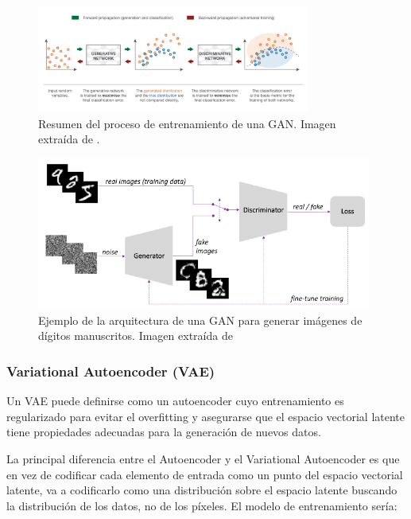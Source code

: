             \begin{figure}[!h]
                \centering
                \includegraphics[width=0.8\textwidth]{img/proceso_entrenamiento_GAN.png}
                \caption{Resumen del proceso de entrenamiento de una GAN. Imagen extraída de \cite{autoencoders2017}.}
            \end{figure}

            \begin{figure}[!h]
                \centering
                \includegraphics[width=0.98\textwidth]{img/GAN.png}
                \caption{Ejemplo de la arquitectura de una GAN para generar imágenes de dígitos manuscritos. Imagen extraída de \cite{AAE}}
                \label{fig:GAN}
            \end{figure}
 
        \subsubsection{Variational Autoencoder (VAE)}
            \noindent Un VAE puede definirse como un autoencoder cuyo entrenamiento es regularizado para evitar el overfitting y asegurarse que el espacio vectorial latente tiene propiedades adecuadas para la generación de nuevos datos.

            \medskip

            \noindent La principal diferencia entre el Autoencoder y el Variational Autoencoder es que en vez de codificar cada elemento de entrada como un punto del espacio vectorial latente, va a codificarlo como una distribución sobre el espacio latente buscando la distribución de los datos, no de los píxeles. El modelo de entrenamiento sería:
            
